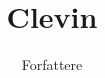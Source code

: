 \documentclass[a4paper,11pt]{article}
\title{Clevin}
\author{Forfattere}
\begin{document}
\maketitle

\begin{sketch}
\end{sketch}
\end{document}
